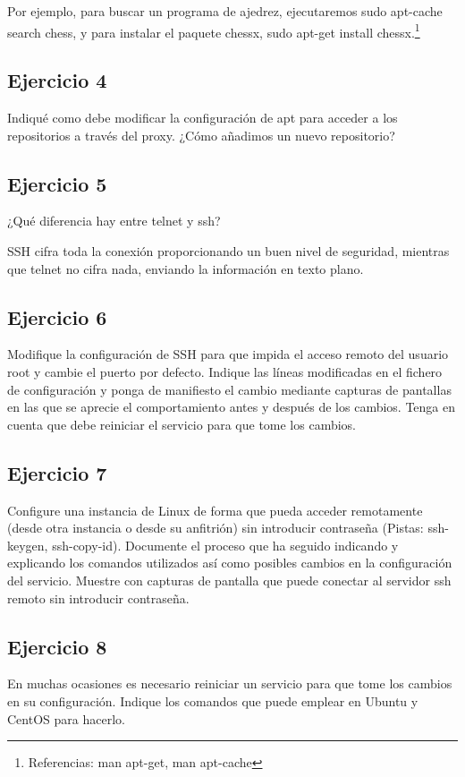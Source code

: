 \documentclass[a4paper, 11pt]{article} %
\begin{document}
Por ejemplo, para buscar un programa de ajedrez, ejecutaremos sudo apt-cache search chess, y para instalar el paquete chessx, sudo apt-get install chessx.\footnote{Referencias: man apt-get, man apt-cache}

\subsection{Ejercicio 4}
Indiqué como debe modificar la configuración de apt para acceder a los
repositorios a través del proxy. ¿Cómo añadimos un nuevo repositorio?


\subsection{Ejercicio 5}
¿Qué diferencia hay entre telnet y ssh?

SSH cifra toda la conexión proporcionando un buen nivel de seguridad, mientras que telnet no cifra nada, enviando la información en texto plano.


\subsection{Ejercicio 6}
Modifique la configuración de SSH para que impida el acceso remoto del
usuario root y cambie el puerto por defecto. Indique las líneas modificadas en el
fichero de configuración y ponga de manifiesto el cambio mediante capturas de
pantallas en las que se aprecie el comportamiento antes y después de los cambios.
Tenga en cuenta que debe reiniciar el servicio para que tome los cambios.


\subsection{Ejercicio 7}
Configure una instancia de Linux de forma que pueda acceder
remotamente (desde otra instancia o desde su anfitrión) sin introducir contraseña
(Pistas: ssh-keygen, ssh-copy-id). Documente el proceso que ha seguido indicando y
explicando los comandos utilizados así como posibles cambios en la configuración del
servicio. Muestre con capturas de pantalla que puede conectar al servidor ssh remoto
sin introducir contraseña.


\subsection{Ejercicio 8}
En muchas ocasiones es necesario reiniciar un servicio para que tome los
cambios en su configuración. Indique los comandos que puede emplear en Ubuntu y
CentOS para hacerlo.
\end{document}
